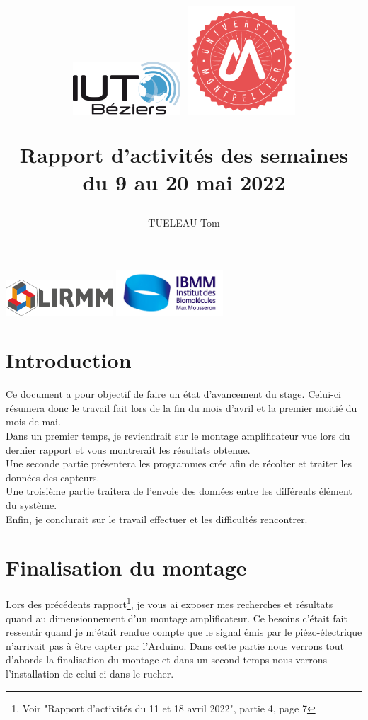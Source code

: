 \documentclass[11pt,french,a4paper]{article}
\title{
 \centering
         \includegraphics[width=4cm]{../../../logo/IUTlogo.png}  \hspace{7cm}
         \includegraphics[width=4cm]{../../../logo/UMlogo.png}  \hspace{7cm}
    
	\LARGE{Rapport d'activités des semaines du 9 au 20 mai 2022 }
	\author{TUELEAU Tom}
}
\author{
	\date{}
}
\begin{document}
\maketitle
	 \includegraphics[width=4cm]{../../../logo/LIRMMlogo.png}  \hspace{7cm}
         \includegraphics[width=4cm]{../../../logo/IBMMlogo.jpg}  \hspace{7cm}
\newpage
\tableofcontents
\newpage
\section{Introduction}
Ce document a pour objectif de faire un état d'avancement du stage. Celui-ci résumera donc le travail fait lors de la fin du mois d'avril et la premier moitié du mois de mai.
\\Dans un premier temps, je reviendrait sur le montage amplificateur vue lors du dernier rapport et vous montrerait les résultats obtenue.
\\Une seconde partie présentera les programmes crée afin de récolter et traiter les données des capteurs. 
\\Une troisième partie traitera de l'envoie des données entre les différents élément du système.
\\Enfin, je conclurait sur le travail effectuer et les difficultés rencontrer. 

\section{Finalisation du montage}
Lors des précédents rapport\footnote{Voir "Rapport d’activités du 11 et 18 avril 2022", partie 4, page 7}, je vous ai exposer mes recherches et résultats quand au dimensionnement d'un montage amplificateur. Ce besoins c'était fait ressentir quand je m'était rendue compte que le signal émis par le piézo-électrique n'arrivait pas à être capter par l'Arduino.  Dans cette partie nous verrons tout d'abords la finalisation du montage et dans un second temps nous verrons l'installation de celui-ci dans le rucher.\\
\end{document}

